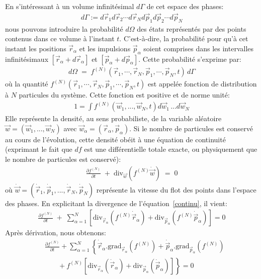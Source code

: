 En s'intéressant à un volume infinitésimal $d\Gamma$ de cet espace des phases:
\begin{align*}
	d\Gamma:=d\vec{r}_{1}d\vec{r}_{2}\cdots d\vec{r}_{N}d\vec{p}_{1}d\vec{p}_{2}\cdots d\vec{p}_{N}
\end{align*}
nous pouvons introduire la probabilité $d\Omega$ des états représentés par des points contenus dans ce volume à l'instant $t$. C'est-à-dire, la probabilité
pour qu'à cet instant les positions $\vec{r}_{\alpha}$ et les {impulsion}s $\vec{p}_{\alpha}$ soient comprises dans les intervalles
infinitésimaux $[\vec{r}_{\alpha }+d\vec{r}_{\alpha}]$ et $[\vec{p}_{\alpha}+d\vec{p}_{\alpha}]$. Cette probabilité s'exprime
par:
\begin{align*}
	d\Omega\;=\;f^{(N)}(\vec{r}_{1},\cdots,\vec{r}_{N},\vec{p}_{1},\cdots,\vec{p}_{N},t)\,d\Gamma
\end{align*}
où la quantité $f^{(N)}(\vec{r}_{1},\cdots,\vec{r} _{N},\vec{p}_{1},\cdots,\vec{p}_{N},t)$ est appelée fonction de distribution à $N$
particules du système. Cette fonction est positive et de norme unité:
\begin{align*}
	1=\int f^{\left(N\right)}\left(\vec{w}_{1},...,\vec{w}_{N},t\right)d\vec{w}_{1}\,...d\vec{w}_{N}
\end{align*}
Elle représente la densité, au sens probabiliste, de la variable aléatoire $\vec{w}=(\vec{w}_{1},...,\vec{w}_{N})$ avec
$\vec{w}_{\alpha}=\left(  \vec{r}_{\alpha},\vec{p}_{\alpha}\right) $. Si le nombre de particules est conservé au cours de l'évolution, cette
densité obéit à une équation de continuité (exprimant le fait que $df$ est une différentielle totale exacte, ou physiquement que le nombre de
particules est conservé):
\begin{align}
	\frac{\partial f^{(N)}}{\partial t}\;+\;\mathrm{div}_{\vec{w}}(f^{(N)}\dot{\vec{w}})\;=\;0\label{continu}%
\end{align}
où $\dot{\vec{w}}=(\dot{\vec{r}}_{1},\dot{\vec{p}}_{1} ,...,\dot{\vec{r}}_{N},\dot{\vec{p}}_{N})$ représente la vitesse du flot des
points dans l'espace des phases. En explicitant la divergence de l'équation~\ref{continu}, il vient:
\begin{align*}
	\frac{\partial f^{(N)}}{\partial t}\;+\;\sum_{\alpha=1}^{N}\left[\mathrm{div}_{\vec{r}_{\alpha}}\left(  f^{(N)}\dot{\vec{r}}_{\alpha
	}\right)  +\mathrm{div}_{\vec{p}_{\alpha}}\left(  f^{(N)}\dot{\vec{p}}_{\alpha}\right)  \right]=0
\end{align*}
Après dérivation, nous obtenons:
\begin{align*}
	&  \frac{\partial f^{(N)}}{\partial t}+\displaystyle\sum\limits_{\alpha=1}%
	^{N}\left\{  \dot{\vec{r}}_{\alpha}.\mathrm{grad}_{\vec{r}_{\alpha}%
	}\left(  f^{(N)}\right)  +\dot{\vec{p}}_{\alpha}.\mathrm{grad}%
	_{\vec{p}_{\alpha}}\left(  f^{(N)}\right)  \right. \\
	&  \,\;\;\;\;\;\;\;\left.  +~f^{(N)}\left[  \mathrm{div}_{\vec{r}_{\alpha}%
	}\left(  \dot{\vec{r}}_{\alpha}\right)  +\mathrm{div}_{\vec{p}_{\alpha}%
	}\left(  \dot{\vec{p}}_{\alpha}\right)  \right]  \right\}=0
\end{align*}
